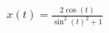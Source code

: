 \documentclass[preview]{standalone}
\begin{document}
\begin{align*}
x(t) = \frac{2  \cos(t)}{\sin^2(t)^2 + 1}
\end{align*}
\end{document}
